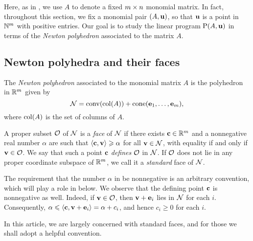 \documentclass[11pt]{amsart}
\begin{document}
Here, as in ,  we use $A$ to denote a fixed $m \times n$ monomial matrix.
In fact, throughout this section, we fix a monomial pair $(A, \mathbf{u})$, so that $\mathbf{u}$ is a point in $\mathbb{N}^m$ with positive entries.  Our goal is to study the linear program $\mathrm{P}(A, \mathbf{u})$ in terms of the \emph{Newton polyhedron} associated to the matrix $A$.


\subsection{Newton polyhedra and their faces}

\begin{definition}
The \emph{Newton polyhedron} associated to the monomial matrix $A$ is the polyhedron in $\mathbb{R}^m$ given by
\[ \mathcal{N} = \operatorname{conv}( \operatorname{col}(A) ) + \operatorname{cone}( \mathbf{e}_1, \ldots, \mathbf{e}_m), \]
where $\operatorname{col}(A)$ is the set of columns of $A$.
\end{definition}

\begin{definition}
   \label{defn: face}
   A proper subset $\mathcal{O}$ of $\mathcal{N}$ is a \emph{face} of $\mathcal{N}$ if there exists $\mathbf{c} \in \mathbb{R}^m$ and a nonnegative real number $\alpha$ are such that $\langle \mathbf{c}, \mathbf{v} \rangle \geqslant \alpha$ for all $\mathbf{v} \in \mathcal{N}$, with equality if and only if $\mathbf{v} \in \mathcal{O}$.
   We say that such a point $\mathbf{c}$ \emph{defines} $\mathcal{O}$ in $\mathcal{N}$.
   If $\mathcal{O}$ does not lie in any proper coordinate subspace of $\mathbb{R}^m$, we call it a \emph{standard} face of $\mathcal{N}$.
\end{definition}

\begin{remark}
   \label{rmk: nonnegativity of defining point}
   The requirement that the number $\alpha$ in  be nonnegative is an arbitrary convention, which will play a role in  below.
   We observe that the defining point $\mathbf{c}$ is nonnegative as well.
   Indeed, if $\mathbf{v} \in \mathcal{O}$, then $\mathbf{v} + \mathbf{e}_i$ lies in $\mathcal{N}$  for each $i$.
   Consequently, $\alpha \leqslant \langle \mathbf{c}, \mathbf{v} + \mathbf{e}_i \rangle = \alpha + c_i$, and hence $c_i \ge 0$ for each $i$.
\end{remark}

In this article, we are largely concerned with standard faces, and for those we shall adopt a helpful convention.
\end{document}
